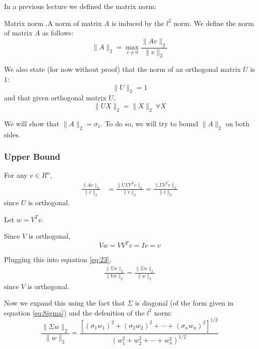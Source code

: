 \documentclass[12pt,letterpaper]{article}
\newcommand{\skipline}{\vspace{\baselineskip}}
\begin{document}
In a previous lecture we defined the matrix norm:
\begin{defn}{Matrix norm}
.A norm of matrix $A$ is induced by the $l^2$ norm. We define the norm of matrix $A$ as follows:
\begin{equation}
	\lVert A \rVert_2 = \max_{v \neq 0} \frac{\lVert A v \rVert_2}{\lVert v \rVert_2}
\end{equation}
\end{defn}

We also state (for now without proof) that the norm of an orthogonal matrix $U$ is $1$:
\begin{equation}
	\lVert U \rVert_2 = 1
\end{equation}
and that given orthogonal matrix $U$,
\begin{equation}
	\lVert UX \rVert_2 = \lVert X \rVert_2 \ \forall X
\end{equation}

\skipline

We will show that $\lVert A \rVert_2 = \sigma_1$. To do so, we will try to bound $\lVert A \rVert_2$ on both sides.

\subsubsection{Upper Bound}
For any $v \in R^n$,
\begin{align} \label{eq:23}
	\frac{\lVert Av \rVert_2}{\lVert v \rVert_2} &= \frac{\lVert U \Sigma V^T v \rVert_2}{\lVert v \rVert_2} = \frac{\lVert \Sigma V^T v \rVert_2}{\lVert v \rVert_2}
\end{align}
since $U$ is orthogonal.

Let $w = V^T v$.

Since $V$ is orthogonal,
\begin{equation}
	Vw = V V^T v = Iv = v
\end{equation}

Plugging this into equation \ref{eq:23},
\begin{align}
	\frac{\lVert \Sigma w\rVert_2}{\lVert Vw \rVert_2} = \frac{\lVert \Sigma w\rVert_2}{\lVert w \rVert_2}
\end{align}
since $V$ is orthogonal.

Now we expand this using the fact that $\Sigma$ is diagonal (of the form given in equation \ref{eq:Sigma}) and the defenition of the $l^2$ norm:
\begin{equation} \label{eq:26}
	\frac{\lVert \Sigma w\rVert_2}{\lVert w \rVert_2} =
	\frac{\left[(\sigma_1 w_1)^2 + (\sigma_2 w_2)^2 + \cdots + (\sigma_n w_n)^2\right]^{1/2}}{(w_1^2 + w_2^2 + \cdots + w_n^2)^{1/2}}
\end{equation}
\end{document}
